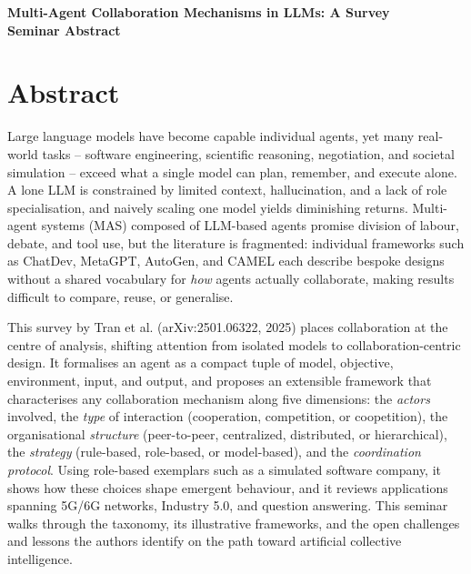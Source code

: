 \documentclass[11pt]{article}
\begin{document}
\begin{center}
{\LARGE\bfseries Multi-Agent Collaboration Mechanisms in LLMs: A Survey}\\[1.1em]
{\large\bfseries Seminar Abstract}\\[0.6em]
{\normalsize \seminarDate}
\end{center}
\vspace{0.6em}
\section*{Abstract}
Large language models have become capable individual agents, yet many real-world tasks -- software engineering, scientific reasoning, negotiation, and societal simulation -- exceed what a single model can plan, remember, and execute alone. A lone LLM is constrained by limited context, hallucination, and a lack of role specialisation, and naively scaling one model yields diminishing returns. Multi-agent systems (MAS) composed of LLM-based agents promise division of labour, debate, and tool use, but the literature is fragmented: individual frameworks such as ChatDev, MetaGPT, AutoGen, and CAMEL each describe bespoke designs without a shared vocabulary for \emph{how} agents actually collaborate, making results difficult to compare, reuse, or generalise.

This survey by Tran et al. (arXiv:2501.06322, 2025) places collaboration at the centre of analysis, shifting attention from isolated models to collaboration-centric design. It formalises an agent as a compact tuple of model, objective, environment, input, and output, and proposes an extensible framework that characterises any collaboration mechanism along five dimensions: the \emph{actors} involved, the \emph{type} of interaction (cooperation, competition, or coopetition), the organisational \emph{structure} (peer-to-peer, centralized, distributed, or hierarchical), the \emph{strategy} (rule-based, role-based, or model-based), and the \emph{coordination protocol}. Using role-based exemplars such as a simulated software company, it shows how these choices shape emergent behaviour, and it reviews applications spanning 5G/6G networks, Industry 5.0, and question answering. This seminar walks through the taxonomy, its illustrative frameworks, and the open challenges and lessons the authors identify on the path toward artificial collective intelligence.
\end{document}
